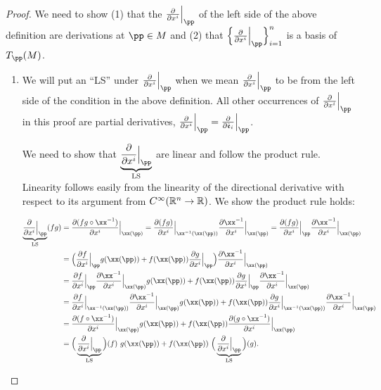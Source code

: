 \begin{proof}
    \newcommand{\pdxiLS}{\underbrace{\frac{\pd}{\pd x^i}\Big|_\pp}_{\text{LS}}}

    We need to show (1) that the $\frac{\pd}{\pd x^i}\Big|_\pp$ of the left side of the above definition are derivations at $\pp \in M$ and (2) that $\Big\{ \frac{\pd}{\pd x^i}\Big|_\pp \Big\}_{i = 1}^n$ is a basis of $T_\pp(M)$.

    \begin{enumerate}
        \item We will put an ``LS'' under $\frac{\pd}{\pd x^i}\Big|_\pp$ when we mean $\frac{\pd}{\pd x^i}\Big|_\pp$ to be from the left side of the condition in the above definition. All other occurrences of $\frac{\pd}{\pd x^i}\Big|_\pp$ in this proof are partial derivatives, $\frac{\pd}{\pd x^i}\Big|_\pp = \frac{\pd}{\pd \see_i}\Big|_\pp$.
    
        We need to show that $\pdxiLS$ are linear and follow the product rule. Linearity follows easily from the linearity of the directional derivative with respect to its argument from $C^\infty(\mathbb{R}^n \rightarrow \mathbb{R})$. We show the product rule holds:
        
        \begin{align*}
           \pdxiLS (fg)
            &= \frac{\pd (fg \circ \xx^{-1})}{\pd x^i}\Big|_{\xx(\pp)} 
            = \frac{\pd (fg)}{\pd x^i}\Big|_{\xx^{-1}(\xx(\pp))} \frac{\pd \xx^{-1}}{\pd x^i}\Big|_{\xx(\pp)}
            = \frac{\pd (fg)}{\pd x^i}\Big|_\pp \frac{\pd \xx^{-1}}{\pd x^i}\Big|_{\xx(\pp)}
            \\
            &= \Big( \frac{\pd f}{\pd x^i}\Big|_\pp g(\xx(\pp)) + f(\xx(\pp)) \frac{\pd g}{\pd x^i}\Big|_\pp \Big) \frac{\pd \xx^{-1}}{\pd x^i}\Big|_{\xx(\pp)} \\
            &= \frac{\pd f}{\pd x^i}\Big|_\pp \frac{\pd \xx^{-1}}{\pd x^i}\Big|_{\xx(\pp)} g(\xx(\pp))
            + f(\xx(\pp)) \frac{\pd g}{\pd x^i}\Big|_\pp \frac{\pd \xx^{-1}}{\pd x^i}\Big|_{\xx(\pp)}  \\
            &= \frac{\pd f}{\pd x^i}\Big|_{\xx^{-1}(\xx(\pp))} \frac{\pd \xx^{-1}}{\pd x^i}\Big|_{\xx(\pp)} g(\xx(\pp))
            + f(\xx(\pp)) \frac{\pd g}{\pd x^i}\Big|_{\xx^{-1}(\xx(\pp))} \frac{\pd \xx^{-1}}{\pd x^i}\Big|_{\xx(\pp)} \\
            &= \frac{\pd (f \circ \xx^{-1})}{\pd x^i}\Big|_{\xx(\pp)} g(\xx(\pp)) + f(\xx(\pp)) \frac{\pd (g \circ \xx^{-1})}{\pd x^i}\Big|_{\xx(\pp)}  \\
            &= \Big( \underbrace{\frac{\pd}{\pd x^i}\Big|_\pp}_{\text{LS}} \Big) (f) \spc g(\xx(\pp)) + f(\xx(\pp)) \spc \Big( \underbrace{\frac{\pd}{\pd x^i}\Big|_\pp}_{\text{LS}} \Big) (g).
        \end{align*}
        

\end{enumerate}
\end{proof}
